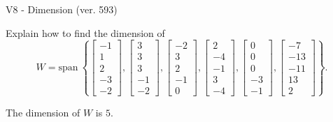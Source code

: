 \begin{exercise}
  \begin{exerciseTitle}V8 - Dimension (ver. 593)\end{exerciseTitle}
  \begin{exerciseStatement}
    Explain how to find the dimension of 
\[W=\mathrm{span}\ \left\{\left[\begin{array}{r}
-1 \\
1 \\
2 \\
-3 \\
-2
\end{array}\right] , \left[\begin{array}{r}
3 \\
3 \\
3 \\
-1 \\
-2
\end{array}\right] , \left[\begin{array}{r}
-2 \\
3 \\
2 \\
-1 \\
0
\end{array}\right] , \left[\begin{array}{r}
2 \\
-4 \\
-1 \\
3 \\
-4
\end{array}\right] , \left[\begin{array}{r}
0 \\
0 \\
0 \\
-3 \\
-1
\end{array}\right] , \left[\begin{array}{r}
-7 \\
-13 \\
-11 \\
13 \\
2
\end{array}\right]\right\}.\]



  \end{exerciseStatement}
  \begin{exerciseAnswer}
   The dimension of \(W\) is  \(5\).
  


  \end{exerciseAnswer}
\end{exercise}